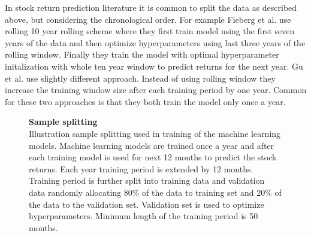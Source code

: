 \documentclass{article}
\begin{document}
In stock return prediction literature it is common to split the data as described above, but considering the chronological order. For example Fieberg et al. \citeyear{Fieberg} use rolling 10 year rolling scheme where they first train model using the first seven years of the data and then optimize hyperparameters using last three years of the rolling window. Finally they train the model with optimal hyperparameter initalization with whole ten year window to predict returns for the next year. Gu et al. \citeyear{guetal} use slightly different approach. Instead of using rolling window they increase the training window size after each training period by one year. Common for these two approaches is that they both train the model only once a year. \par

\begin{figure}[ht]
\centering
\label{plot:SampleSplittingScheme}
\caption[Sample splitting scheme]{\textbf{Sample splitting}\\ Illustration sample splitting used in training of the machine learning models. Machine learning models are trained once a year and after each training model is used for next 12 months to predict the stock returns. Each year training period is extended by 12 months. Training period is further split into training data and validation data randomly allocating 80\% of the data to training set and 20\% of the data to the validation set. Validation set is used to optimize hyperparameters. Minimum length of the training period is 50 months.}
\label{plot:Turnover}
\end{figure}
\end{document}
